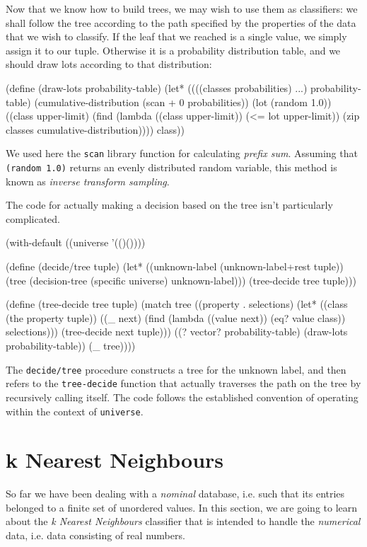 Now that we know how to build trees, we may wish to use
them as classifiers: we shall follow the tree according
to the path specified by the properties of the data that
we wish to classify. If the leaf that we reached is
a single value, we simply assign it to our tuple.
Otherwise it is a probability distribution table, and
we should draw lots according to that distribution:

\begin{Snippet}
(define (draw-lots probability-table)
  (let* ((((classes probabilities) ...) probability-table)
	 (cumulative-distribution (scan + 0 probabilities))
	 (lot (random 1.0))
	 ((class upper-limit) (find (lambda ((class upper-limit))
				      (<= lot upper-limit))
				    (zip classes 
					 cumulative-distribution))))
    class))
\end{Snippet}

We used here the \texttt{scan} library function for calculating
\textit{prefix sum}. Assuming that \texttt{(random 1.0)} returns
an evenly distributed random variable, this method is known
as \textit{inverse transform sampling}.

The code for actually making a decision based on the tree
isn't particularly complicated.
\begin{Snippet}
(with-default ((universe '(()())))

  (define (decide/tree tuple)
    (let* ((unknown-label (unknown-label+rest tuple))
	   (tree (decision-tree (specific universe) unknown-label)))
      (tree-decide tree tuple)))
  
   (define (tree-decide tree tuple)
     (match tree
       ((property . selections)
	(let* ((class (the property tuple))
	       ((_ next) (find (lambda ((value next)) 
		                 (eq? value class)) 
			       selections)))
	  (tree-decide next tuple)))
       ((? vector? probability-table)
	(draw-lots probability-table))
       (_
	tree))))
\end{Snippet}
The \texttt{decide/tree} procedure constructs a tree for the
unknown label, and then refers to the \texttt{tree-decide}
function that actually traverses the path on the tree by
recursively calling itself. The code follows the established
convention of operating within the context of \texttt{universe}.

\section{k Nearest Neighbours}

So far we have been dealing with a \textit{nominal} database,
i.e. such that its entries belonged to a finite set of
unordered values. In this section, we are going to learn
about the \textit{k Nearest Neighbours} classifier that
is intended to handle the \textit{numerical} data, i.e.
data consisting of real numbers.

